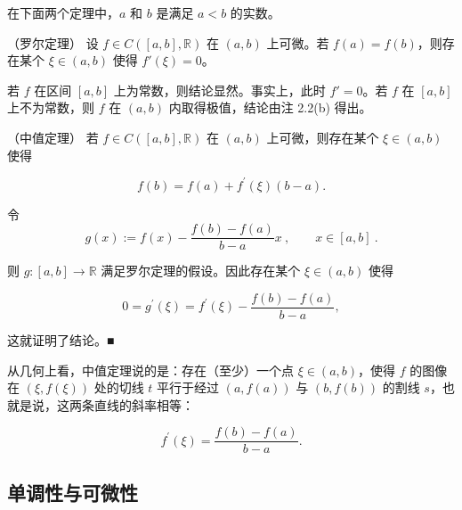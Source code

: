 在下面两个定理中，$a$ 和 $b$ 是满足 $a < b$ 的实数。

\begin{theorem}

（罗尔定理） 设 $ f \in C([a, b], \mathbb{R}) $ 在 $ (a, b) $ 上可微。若 $ f(a) = f(b) $，则存在某个 $ \xi \in (a, b) $ 使得 $ f'(\xi) = 0 $。

\proofhead
若 $f$ 在区间 $[a,b]$ 上为常数，则结论显然。事实上，此时 $f'=0$。若 $f$ 在 $[a,b]$ 上不为常数，则 $f$ 在 $(a,b)$ 内取得极值，结论由注 2.2(b) 得出。
\end{theorem}

\begin{theorem}

（中值定理） 若 $ f \in C([a, b], \mathbb{R}) $ 在 $ (a, b) $ 上可微，则存在某个 $ \xi \in (a, b) $ 使得

\[
f(b)=f(a)+f^{\prime}(\xi)(b-a).
\]

\proofhead
令
\[
g(x):=f(x)-\frac{f(b)-f(a)}{b-a}x~,\qquad x\in[a,b]~.
\]

则 $ g\colon [a,b] \to \mathbb{R} $ 满足罗尔定理的假设。因此存在某个 $ \xi \in (a,b) $ 使得

\[
0=g^{\prime}(\xi)=f^{\prime}(\xi)-\frac{f(b)-f(a)}{b-a},
\]

这就证明了结论。■

\end{theorem}

从几何上看，中值定理说的是：存在（至少）一个点 $ \xi \in (a, b) $，使得 $ f $ 的图像在 $ (\xi, f(\xi)) $ 处的切线 $ t $ 平行于经过 $ (a, f(a)) $ 与 $ (b, f(b)) $ 的割线 $ s $，也就是说，这两条直线的斜率相等：

\[
f^{\prime}(\xi)=\frac{f(b)-f(a)}{b-a}.
\]

\subsection*{单调性与可微性}

